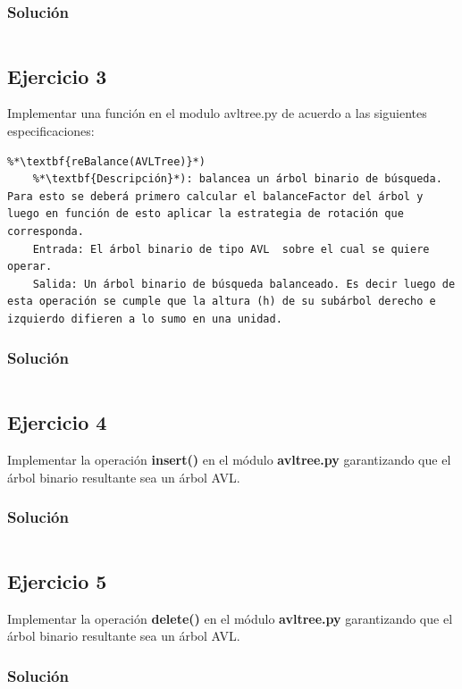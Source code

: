 \documentclass{article}
\begin{document}
\subsubsection*{Solución}
\inputminted{python3}{./code/snippets/ejercicio2.py}


\subsection*{Ejercicio 3}
Implementar una función en el modulo avltree.py de acuerdo a  las siguientes especificaciones:

\begin{lstlisting}
%*\textbf{reBalance(AVLTree)}*)
    %*\textbf{Descripción}*): balancea un árbol binario de búsqueda. Para esto se deberá primero calcular el balanceFactor del árbol y luego en función de esto aplicar la estrategia de rotación que corresponda.
    Entrada: El árbol binario de tipo AVL  sobre el cual se quiere operar.
    Salida: Un árbol binario de búsqueda balanceado. Es decir luego de esta operación se cumple que la altura (h) de su subárbol derecho e izquierdo difieren a lo sumo en una unidad.
\end{lstlisting}
\subsubsection*{Solución}
\setlength{\fboxsep}{0pt}
\inputminted{python3}{./code/snippets/ejercicio3.py}


\subsection*{Ejercicio 4}
Implementar la operación \textbf{insert()} en  el módulo \textbf{avltree.py} garantizando que el árbol  binario resultante sea un árbol AVL. 
\subsubsection*{Solución}
\inputminted{python3}{./code/snippets/ejercicio4.py}


\subsection*{Ejercicio 5}
Implementar la operación \textbf{delete()} en  el módulo \textbf{avltree.py} garantizando que el árbol  binario resultante sea un árbol AVL.
\subsubsection*{Solución}
\inputminted{python3}{./code/snippets/ejercicio5.py}
\end{document}
